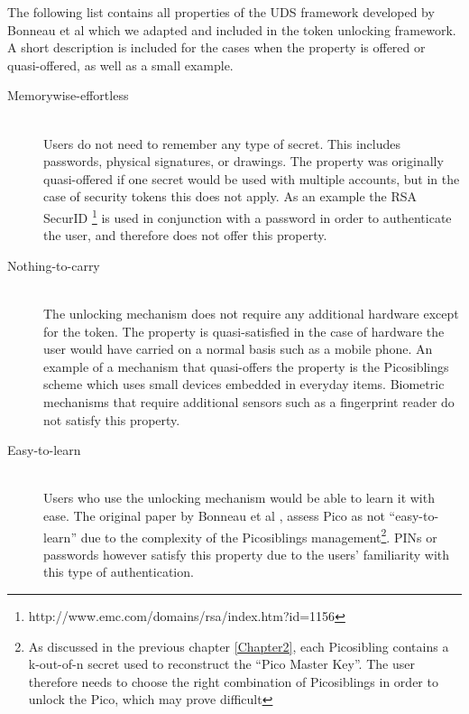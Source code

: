 The following list contains all properties of the UDS framework developed by Bonneau et al \cite{bonneau2012quest} which we adapted and included in the token unlocking framework. A short description is included for the cases when the property is offered or quasi-offered, as well as a small example.
\begin{description}
  
  
  \item[Memorywise-effortless] \hfill \\
  Users do not need to remember any type of secret. This includes passwords, physical signatures, or drawings. The property was originally quasi-offered if one secret would be used with multiple accounts, but in the case of security tokens this does not apply. As an example the RSA SecurID \footnote{http://www.emc.com/domains/rsa/index.htm?id=1156} is used in conjunction with a password in order to authenticate the user, and therefore does not offer this property.
  
  \item[Nothing-to-carry] \hfill \\
  The unlocking mechanism does not require any additional hardware except for the token. The property is quasi-satisfied in the case of hardware the user would have carried on a normal basis such as a mobile phone. An example of a mechanism that quasi-offers the property is the Picosiblings scheme which uses small devices embedded in everyday items. Biometric mechanisms that require additional sensors such as a fingerprint reader do not satisfy this property. 
  
  \item[Easy-to-learn] \hfill \\
  Users who use the unlocking mechanism would be able to learn it with ease. The original paper by Bonneau et al \cite{bonneau2012quest}, assess Pico as not ``easy-to-learn'' due to the complexity of the Picosiblings management\footnote{As discussed in the previous chapter \ref{Chapter2}, each Picosibling contains a k-out-of-n secret used to reconstruct the ``Pico Master Key''. The user therefore needs to choose the right combination of Picosiblings in order to unlock the Pico, which may prove difficult}. PINs or passwords however satisfy this property due to the users' familiarity with this type of authentication.
  

\end{description}
